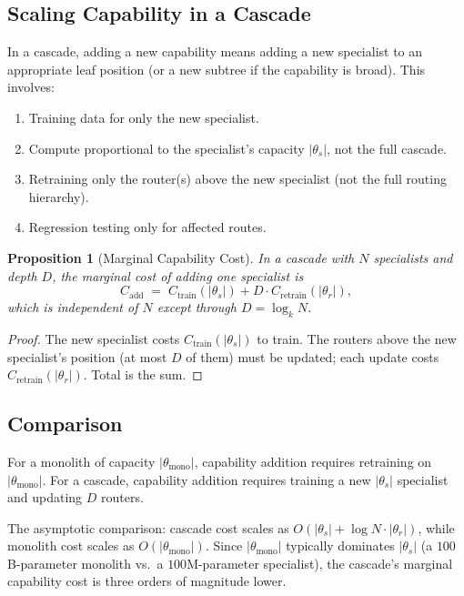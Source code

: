 \documentclass[11pt,twocolumn,a4paper]{article}
\newtheorem{proposition}[theorem]{Proposition}
\theoremstyle{definition}
\theoremstyle{remark}
\begin{document}
\subsection{Scaling Capability in a Cascade}

In a cascade, adding a new capability means adding a new specialist to an appropriate leaf position (or a new subtree if the capability is broad). This involves:
\begin{enumerate}
    \item Training data for only the new specialist.
    \item Compute proportional to the specialist's capacity $|\theta_s|$, not the full cascade.
    \item Retraining only the router(s) above the new specialist (not the full routing hierarchy).
    \item Regression testing only for affected routes.
\end{enumerate}

\begin{proposition}[Marginal Capability Cost]
\label{prop:marginal}
In a cascade with $N$ specialists and depth $D$, the marginal cost of adding one specialist is
\[
C_{\text{add}} \;=\; C_{\text{train}}(|\theta_s|) + D \cdot C_{\text{retrain}}(|\theta_r|),
\]
which is independent of $N$ except through $D = \log_k N$.
\end{proposition}

\begin{proof}
The new specialist costs $C_{\text{train}}(|\theta_s|)$ to train. The routers above the new specialist's position (at most $D$ of them) must be updated; each update costs $C_{\text{retrain}}(|\theta_r|)$. Total is the sum.
\end{proof}

\subsection{Comparison}

For a monolith of capacity $|\theta_{\text{mono}}|$, capability addition requires retraining on $|\theta_{\text{mono}}|$. For a cascade, capability addition requires training a new $|\theta_s|$ specialist and updating $D$ routers.

The asymptotic comparison: cascade cost scales as $O(|\theta_s| + \log N \cdot |\theta_r|)$, while monolith cost scales as $O(|\theta_{\text{mono}}|)$. Since $|\theta_{\text{mono}}|$ typically dominates $|\theta_s|$ (a $100$B-parameter monolith vs.\ a $100$M-parameter specialist), the cascade's marginal capability cost is three orders of magnitude lower.
\end{document}
